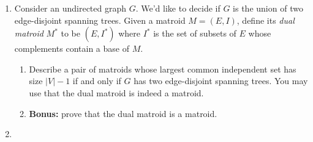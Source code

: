 \documentclass[12pt]{article} 
\begin{document}
\begin{enumerate}
\begin{enumerate}
\item  Let $G$ be the underlying undirected graph of $D$ obtained by forgetting the directions of the edges.\footnote{$G$ may have multi-edges if both directions $(u,v)$ and $(v,u)$ of an edge were present in $E(D)$.} Show that any subgraph of $D$ which corresponds to a spanning tree in $G$ and has at most one edge entering each vertex is an arborescence.
\item Show that the set of arborescences of $D, r$ is the set of common bases of two matroids. \textbf{Hint: } \footnote{Again you can use the intersection of a graphic matroid and a partition matroid.}
\end{enumerate}
\newpage
\item Consider an undirected graph $G$. We'd like to decide if $G$ is the union of two edge-disjoint spanning trees. Given a matroid $M = (E, I)$, define its \emph{dual matroid} $M^* $ to be $(E, I^*)$ where $I^*$ is the set of subsets of $E$ whose complements contain a base of $M$. 
\begin{enumerate}
\item Describe a pair of matroids whose largest common independent set has size $|V|-1$ if and only if $G$ has two edge-disjoint spanning trees. You may use that the dual matroid is indeed a matroid.
\item \textbf{Bonus: } prove that the dual matroid is a matroid.
\end{enumerate}
\item 



\end{enumerate}
\end{document}

